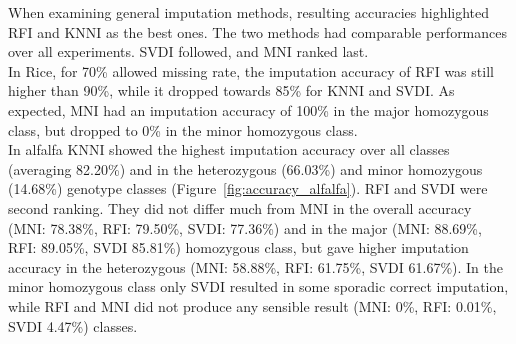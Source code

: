 When examining general imputation methods, resulting accuracies highlighted RFI and KNNI as the best ones. The two methods had comparable performances over all experiments. SVDI followed, and MNI ranked last.\\
In Rice, for 70\% allowed missing rate, the imputation accuracy of RFI was still higher than 90\%, while it dropped towards 85\% for KNNI and SVDI. As expected, MNI had an imputation accuracy of 100\% in the major homozygous class, but dropped to 0\% in the minor homozygous class.\\
In alfalfa KNNI showed the highest imputation accuracy over all classes (averaging 82.20\%) and in the heterozygous (66.03\%) and minor homozygous (14.68\%) genotype classes (Figure~\ref{fig:accuracy_alfalfa}). RFI and SVDI were second ranking. They did not differ much from MNI in the overall accuracy (MNI: 78.38\%, RFI: 79.50\%, SVDI: 77.36\%) and in the major (MNI: 88.69\%, RFI: 89.05\%, SVDI 85.81\%) homozygous class, but gave higher imputation accuracy in the heterozygous (MNI: 58.88\%, RFI: 61.75\%, SVDI 61.67\%). In the minor homozygous class only SVDI resulted in some sporadic correct imputation, while RFI and MNI did not produce any sensible result (MNI: 0\%, RFI: 0.01\%, SVDI 4.47\%) classes. 

